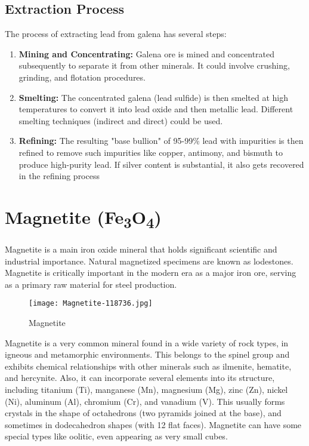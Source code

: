 \documentclass[12pt,a4paper, top=1.9cm, bottom=2.03cm, left=3.81cm, right=1.9cm]{article}
\begin{document}
\subsection{Extraction Process}
\noindent\fontsize{12}{14}\selectfont The process of extracting lead from galena has several steps:
\begin{enumerate}[label=\arabic*.]  %
 \item \textbf{Mining and Concentrating:} Galena ore is mined and concentrated subsequently to separate it from other minerals. It could involve crushing, grinding, and flotation procedures.
 \item \textbf{Smelting:} The concentrated galena (lead sulfide) is then smelted at high temperatures to convert it into lead oxide and then metallic lead. Different smelting techniques (indirect and direct) could be used.
 \item \textbf{Refining:} The resulting "base bullion" of 95-99\% lead with impurities is then refined to remove such impurities like copper, antimony, and bismuth to produce high-purity lead. If silver content is substantial, it also gets recovered in the refining process
\end{enumerate}
\newpage
\section{Magnetite (Fe\textsubscript{3}O\textsubscript{4})}
\onehalfspacing
\noindent\fontsize{12}{14}\selectfont Magnetite is a main iron oxide mineral that holds significant scientific and industrial importance. Natural magnetized specimens are known as lodestones. Magnetite is critically important in the modern era as a major iron ore, serving as a primary raw material for steel production.
\begin{figure}[h!]
        \centering
        \texttt{[image: Magnetite-118736.jpg]}  %
        \caption{Magnetite}
    \end{figure}
    
\noindent\fontsize{12}{14}\selectfont Magnetite is a very common mineral found in a wide variety of rock types, in igneous and metamorphic environments. This belongs to the spinel group and exhibits chemical relationships with other minerals such as ilmenite, hematite, and hercynite. Also, it can incorporate several elements into its structure, including titanium (Ti), manganese (Mn), magnesium (Mg), zinc (Zn), nickel (Ni), aluminum (Al), chromium (Cr), and vanadium (V). This usually forms crystals in the shape of octahedrons (two pyramids joined at the base), and sometimes in dodecahedron shapes (with 12 flat faces). Magnetite can have some special types like oolitic, even appearing as very small cubes.
\end{document}

